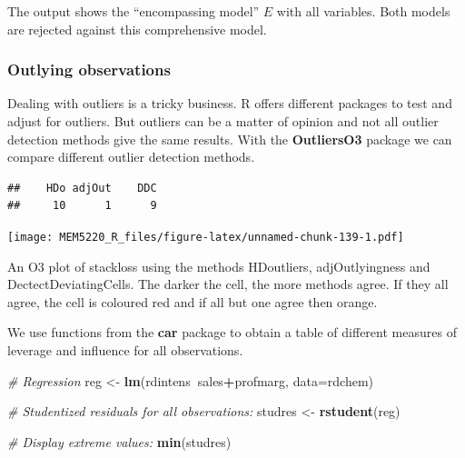 \documentclass[]{book}
\newenvironment{Shaded}{\begin{snugshade}}{\end{snugshade}}
\newcommand{\CommentTok}[1]{\textcolor[rgb]{0.56,0.35,0.01}{\textit{#1}}}
\newcommand{\DataTypeTok}[1]{\textcolor[rgb]{0.13,0.29,0.53}{#1}}
\newcommand{\KeywordTok}[1]{\textcolor[rgb]{0.13,0.29,0.53}{\textbf{#1}}}
\newcommand{\NormalTok}[1]{#1}
\newcommand{\OperatorTok}[1]{\textcolor[rgb]{0.81,0.36,0.00}{\textbf{#1}}}
\newcommand{\StringTok}[1]{\textcolor[rgb]{0.31,0.60,0.02}{#1}}
\begin{document}
The output shows the ``encompassing model'' \(E\) with all variables. Both models are rejected against this comprehensive model.

\hypertarget{outlying-observations}{%
\subsubsection{Outlying observations}\label{outlying-observations}}

Dealing with outliers is a tricky business. R offers different packages to test and adjust for outliers. But outliers can be a matter of opinion and not all outlier detection methods give the same results. With the \textbf{OutliersO3} package we can compare different outlier detection methods.

\begin{Shaded}
\end{Shaded}

\begin{verbatim}
##    HDo adjOut    DDC 
##     10      1      9
\end{verbatim}

\begin{Shaded}
\end{Shaded}

\texttt{[image: MEM5220\_R\_files/figure-latex/unnamed-chunk-139-1.pdf]}

An O3 plot of stackloss using the methods HDoutliers, adjOutlyingness
and DectectDeviatingCells. The darker the cell, the more methods agree. If they all agree, the cell is coloured red and if all but one agree then orange.

We use functions from the \textbf{car} package to obtain a table of different measures of leverage and influence for all observations.

\begin{Shaded}
\begin{Highlighting}[]
\CommentTok{# Regression}
\NormalTok{reg <-}\StringTok{ }\KeywordTok{lm}\NormalTok{(rdintens}\OperatorTok{~}\NormalTok{sales}\OperatorTok{+}\NormalTok{profmarg, }\DataTypeTok{data=}\NormalTok{rdchem)}

\CommentTok{# Studentized residuals for all observations:}
\NormalTok{studres <-}\StringTok{ }\KeywordTok{rstudent}\NormalTok{(reg)}

\CommentTok{# Display extreme values:}
\KeywordTok{min}\NormalTok{(studres)}
\end{Highlighting}
\end{Shaded}
\end{document}
